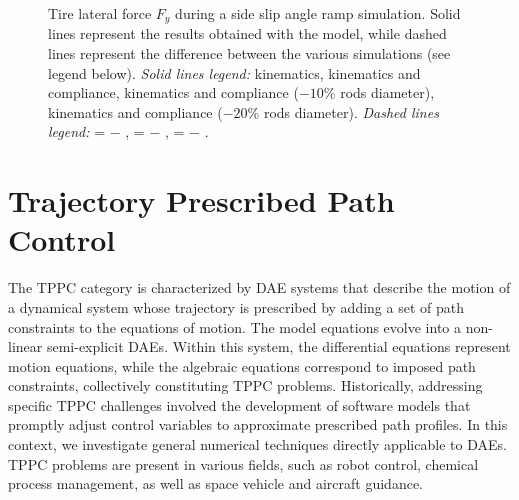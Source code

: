 \begin{figure}[!htp]
  \centering
  \small{}
  \caption{Tire lateral force $F_y$ during a side slip angle ramp simulation. Solid lines represent the results obtained with the \Simulink{} model, while dashed lines represent the difference between the various simulations (see legend below). \emph{Solid lines legend:}
  {\color{mycolor1}\raisebox{-.15pt}{$\blacksquare$}} kinematics, {\color{mycolor2}\raisebox{-.15pt}{$\blacksquare$}} kinematics and compliance, {\color{mycolor3}\raisebox{-.15pt}{$\blacksquare$}} kinematics and compliance ($-10\%$ rods diameter), {\color{mycolor5}\raisebox{-.15pt}{$\blacksquare$}} kinematics and compliance ($-20\%$ rods diameter).   \emph{Dashed lines legend:} {\color{mycolor1}\raisebox{-.15pt}{\scalebox{0.5}[1.0]{$\blacksquare$}}}{\color{mycolor2}\raisebox{-.15pt}{\scalebox{0.5}[1.0]{$\blacksquare$}}} = {\color{mycolor1}\raisebox{-.15pt}{$\blacksquare$}} $-$ {\color{mycolor2}\raisebox{-.15pt}{$\blacksquare$}}, {\color{mycolor1}\raisebox{-.15pt}{\scalebox{0.5}[1.0]{$\blacksquare$}}}{\color{mycolor3}\raisebox{-.15pt}{\scalebox{0.5}[1.0]{$\blacksquare$}}} = {\color{mycolor1}\raisebox{-.15pt}{$\blacksquare$}} $-$ {\color{mycolor3}\raisebox{-.15pt}{$\blacksquare$}},  {\color{mycolor1}\raisebox{-.15pt}{\scalebox{0.5}[1.0]{$\blacksquare$}}}{\color{mycolor5}\raisebox{-.15pt}{\scalebox{0.5}[1.0]{$\blacksquare$}}} = {\color{mycolor1}\raisebox{-.15pt}{$\blacksquare$}} $-$ {\color{mycolor5}\raisebox{-.15pt}{$\blacksquare$}}.
  }
  \label{chap4:fig:test_bench}
\end{figure}

\section{Trajectory Prescribed Path Control}
\label{chap4:sec:tppc}

The \ac{TPPC} category is characterized by \ac{DAE} systems that describe the motion of a dynamical system whose trajectory is prescribed by adding a set of path constraints to the equations of motion. The model equations evolve into a non-linear semi-explicit \acp{DAE}. Within this system, the differential equations represent motion equations, while the algebraic equations correspond to imposed path constraints, collectively constituting \ac{TPPC} problems. Historically, addressing specific \ac{TPPC} challenges involved the development of software models that promptly adjust control variables to approximate prescribed path profiles. In this context, we investigate general numerical techniques directly applicable to \acp{DAE}. \ac{TPPC} problems are present in various fields, such as robot control, chemical process management, as well as space vehicle and aircraft guidance.

